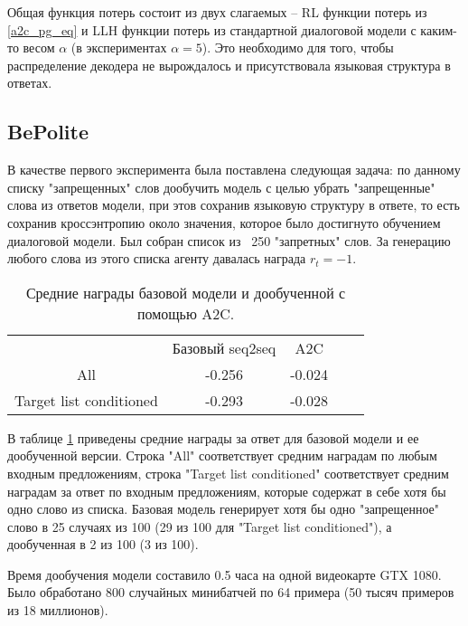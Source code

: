 \documentclass[]{article}
\begin{document}
Общая функция потерь состоит из двух слагаемых -- RL функции потерь из \ref{a2c_pg_eq} и LLH функции потерь из стандартной диалоговой модели с каким-то весом $\alpha$ (в экспериментах $\alpha=5$). Это необходимо для того, чтобы распределение декодера не вырождалось и присутствовала языковая структура в ответах.

\subsection{BePolite}

В качестве первого эксперимента была поставлена следующая задача: по данному списку "запрещенных" слов дообучить модель с целью убрать "запрещенные" слова из ответов модели, при этов сохранив языковую структуру в ответе, то есть сохранив кроссэнтропию около значения, которое было достигнуто обучением диалоговой модели. Был собран список из ~250 "запретных" слов. За генерацию любого слова из этого списка агенту давалась награда $r_t = -1$. 

\begin{table}[h]
	\centering
	\begin{tabular}{cccll}
		\multicolumn{1}{c|}{}  & \multicolumn{1}{c|}{Базовый seq2seq} & \multicolumn{1}{c|}{A2C} &  &  \\ \cline{1-3}
		\multicolumn{1}{c|}{All} & \multicolumn{1}{c|}{-0.256} & \multicolumn{1}{c|}{-0.024} &  &  \\ \cline{1-3}
		\multicolumn{1}{c|}{Target list conditioned} & \multicolumn{1}{c|}{-0.293} & \multicolumn{1}{c|}{-0.028} &  &  \\ \cline{1-3}
	\end{tabular}
	\caption{Средние награды базовой модели и дообученной с помощью A2C.}
	\label{table_rewards_obscene}
\end{table}

В таблице \ref{table_rewards_obscene} приведены средние награды за ответ для базовой модели и ее дообученной версии. Строка "All" соответствует средним наградам по любым входным предложениям, строка "Target list conditioned" соответствует средним наградам за ответ по входным предложениям, которые содержат в себе хотя бы одно слово из списка. Базовая модель генерирует хотя бы одно "запрещенное" слово в 25 случаях из 100 (29 из 100 для "Target list conditioned"), а дообученная в 2 из 100 (3 из 100). 

Время дообучения модели составило 0.5 часа на одной видеокарте GTX 1080. Было обработано 800 случайных минибатчей по 64 примера (50 тысяч примеров из 18 миллионов).
\end{document}
